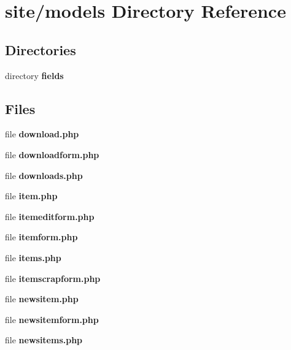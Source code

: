 \section{site/models Directory Reference}
\label{dir_4e2a54b9ca8045f3aaefabd88ddbb71c}
\subsection*{Directories}
\begin{DoxyCompactItemize}
\item 
directory \textbf{ fields}
\end{DoxyCompactItemize}
\subsection*{Files}
\begin{DoxyCompactItemize}
\item 
file \textbf{ download.\+php}
\item 
file \textbf{ downloadform.\+php}
\item 
file \textbf{ downloads.\+php}
\item 
file \textbf{ item.\+php}
\item 
file \textbf{ itemeditform.\+php}
\item 
file \textbf{ itemform.\+php}
\item 
file \textbf{ items.\+php}
\item 
file \textbf{ itemscrapform.\+php}
\item 
file \textbf{ newsitem.\+php}
\item 
file \textbf{ newsitemform.\+php}
\item 
file \textbf{ newsitems.\+php}
\end{DoxyCompactItemize}
